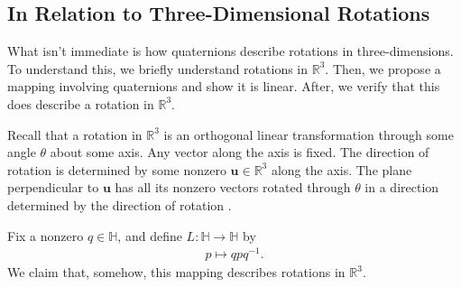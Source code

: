 \documentclass[12pt]{article}
\theoremstyle{plain}
\theoremstyle{definition}
\begin{document}
\subsection{In Relation to Three-Dimensional Rotations}
What isn't immediate is how quaternions describe rotations in three-dimensions. To understand this, we briefly understand rotations in $\mathbb{R}^3$. Then, we propose a mapping involving quaternions and show it is linear. After, we verify that this does describe a rotation in $\mathbb{R}^3$.

Recall that a rotation in $\mathbb{R}^3$ is an orthogonal linear transformation through some angle $\theta$ about some axis. Any vector along the axis is fixed. The direction of rotation is determined by some nonzero $\textbf{u}\in\mathbb{R}^3$ along the axis. The plane perpendicular to $\textbf{u}$ has all its nonzero vectors rotated through $\theta$ in a direction determined by the direction of rotation \cite{anton}.

Fix a nonzero $q\in\mathbb{H}$, and define $L:\mathbb{H}\to\mathbb{H}$ by
\begin{align*}
    p \mapsto qpq^{-1}.
\end{align*}
We claim that, somehow, this mapping describes rotations in $\mathbb{R}^3$. 
\end{document}
